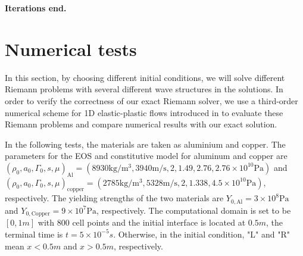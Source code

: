 \documentclass{article}
\numberwithin{equation}{section}
\numberwithin{table}{section}
\begin{document}
\textbf{Iterations end.}


\section{Numerical  tests }
In this section, by choosing different initial conditions, we will solve different Riemann problems with several different wave structures in the solutions. In order to verify the correctness of our exact Riemann solver, we use a third-order numerical scheme for 1D elastic-plastic flows introduced in \cite{liumulti} to evaluate these Riemann problems and compare numerical results with our exact solution.


In the following tests, the materials are taken as  aluminium and copper. The parameters for the EOS and constitutive model for aluminum and copper  are
$ (\rho_0, a_0, \Gamma_0, s, \mu)_{\text{Al}} =(8930 \text{kg}/\text{m}^3, 3940 \text{m}/\text{s},2, 1.49, 2.76 ,2.76\times 10^{10} \text{Pa} )$ and   $(\rho_0, a_0, \Gamma_0, s, \mu)_{\text{copper}} =(2785 \text{kg}/\text{m}^3, 5328 \text{m}/\text{s},2, 1.338,4.5\times 10^{10}\text{Pa})$, respectively.  The yielding strengths of the two materials are $Y_{0,\text{Al}} = 3\times 10^8 \text{Pa}$ and   $Y_{0,\text{Copper}} = 9\times 10^7 \text{Pa}$, respectively.  The computational domain is set to be $[0,1m]$ with 800 cell points and the initial interface is located at $0.5m$, the terminal time is $t=5\times 10^{-5}s$. Otherwise, in the initial condition, "L" and "R" mean $x<0.5m$ and $x>0.5m$, respectively.
\end{document}
